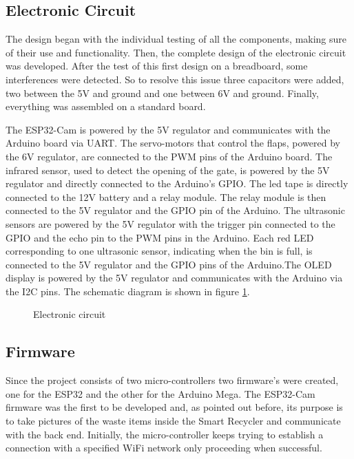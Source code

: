 \documentclass[a4paper,11pt]{article}
\begin{document}
\subsection{Electronic Circuit}
The design began with the individual testing of all the components, making sure of their use and functionality. Then, the complete design of the electronic circuit was developed. After the test of this first design on a breadboard, some interferences were detected. So to resolve this issue three capacitors were added, two between the 5V and ground and one between 6V and ground. Finally, everything was assembled on a standard board.

The ESP32-Cam is powered by the 5V regulator and communicates with the Arduino board via UART. The servo-motors that control the flaps, powered by the 6V regulator, are connected to the PWM pins of the Arduino board. The infrared sensor, used to detect the opening of the gate, is powered by the 5V regulator and directly connected to the Arduino's GPIO. The led tape is directly connected to the 12V battery and a relay module. The relay module is then connected to the 5V regulator and the GPIO pin of the Arduino. The ultrasonic sensors are powered by the 5V regulator with the trigger pin connected to the GPIO and the echo pin to the PWM pins in the Arduino. Each red LED corresponding to one ultrasonic sensor, indicating when the bin is full, is connected to the 5V regulator and the GPIO pins of the Arduino.The OLED display is powered by the 5V regulator and communicates with the Arduino via the I2C pins. The schematic diagram is shown in figure \ref{fig:circuit}.
\newpage

\begin{figure}[H]
  \centering
  
  \caption{\small{Electronic circuit}}
  \label{fig:circuit}
\end{figure}

\newpage

\subsection{Firmware}
Since the project consists of two micro-controllers two firmware's were created, one for the ESP32 and the other for the Arduino Mega. The ESP32-Cam firmware was the first to be developed and, as pointed out before, its purpose is to take pictures of the waste items inside the Smart Recycler and communicate with the back end. Initially, the micro-controller keeps trying to establish a connection with a specified WiFi network only proceeding when successful.
\end{document}
